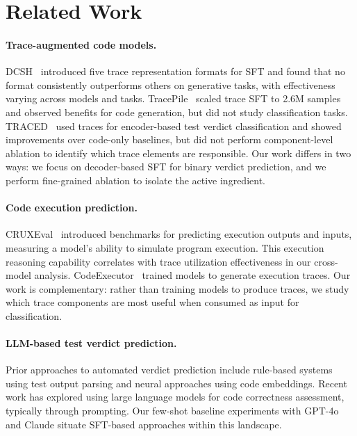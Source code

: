 \documentclass[11pt]{article}
\begin{document}
\section{Related Work}
\label{sec:related}

\paragraph{Trace-augmented code models.}
DCSH~\cite{dcsh2025} introduced five trace representation formats for SFT and found that no format consistently outperforms others on generative tasks, with effectiveness varying across models and tasks. TracePile~\cite{tracepile2025} scaled trace SFT to 2.6M samples and observed benefits for code generation, but did not study classification tasks. TRACED~\cite{traced2024} used traces for encoder-based test verdict classification and showed improvements over code-only baselines, but did not perform component-level ablation to identify which trace elements are responsible. Our work differs in two ways: we focus on decoder-based SFT for binary verdict prediction, and we perform fine-grained ablation to isolate the active ingredient.

\paragraph{Code execution prediction.}
CRUXEval~\cite{cruxeval2024} introduced benchmarks for predicting execution outputs and inputs, measuring a model's ability to simulate program execution. This execution reasoning capability correlates with trace utilization effectiveness in our cross-model analysis. CodeExecutor~\cite{codeexecutor2024} trained models to generate execution traces. Our work is complementary: rather than training models to produce traces, we study which trace components are most useful when consumed as input for classification.

\paragraph{LLM-based test verdict prediction.}
Prior approaches to automated verdict prediction include rule-based systems using test output parsing and neural approaches using code embeddings. Recent work has explored using large language models for code correctness assessment, typically through prompting. Our few-shot baseline experiments with GPT-4o and Claude situate SFT-based approaches within this landscape.
\end{document}
